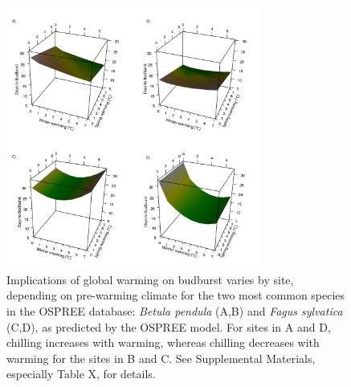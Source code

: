 \documentclass{article}
\begin{document}
\begin{figure}[h!]
\centering
\noindent \includegraphics[width=0.75\textwidth]{..//..//analyses/bb_analysis/figures/forecasting/bbmod_3dplot_utah_obs.pdf}
\caption{Implications of global warming on budburst varies by site, depending on pre-warming climate for the two most common species in the OSPREE database: \emph{Betula pendula} (A,B) and \emph{Fagus sylvatica} (C,D), as predicted by the OSPREE model. For sites in A and D, chilling increases with warming, whereas chilling decreases with warming for the sites in B and C. See Supplemental Materials, especially Table X, for details.}
\label{fig:fore}
\end{figure}

\end{document}
